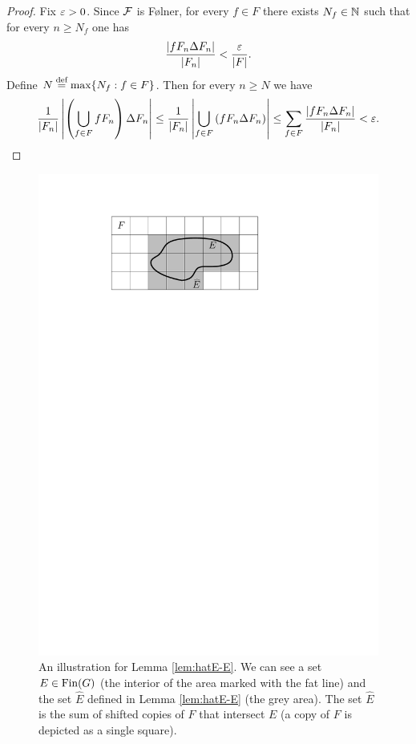 \begin{proof}
Fix $\varepsilon>0$. Since $\operatorname{\mathcal{F}}$ is F{\o}lner, for every $f\in F$ there exists $N_f\in\mathbb{N}$ such that for every $n\geq N_f$ one has
\[
\frac{|fF_n\Delta F_n|}{|F_n|}<\frac{\varepsilon}{|F|}.
\]
Define $N\stackrel{\textup{def}}{=} \max\{N_f: f\in F\}$. Then for every $n\geq N$ we have
\[
\frac{1}{|F_n|}\left|\left(\bigcup_{f\in F}fF_n\right)\Delta F_n\right|\leq \frac{1}{|F_n|}\left|\bigcup_{f\in F}\left(fF_n\Delta F_n\right)\right|\leq\sum_{f\in F}\frac{\left|fF_n\Delta F_n\right|}{|F_n|}<\varepsilon. \qedhere
\]
\end{proof}



\begin{figure}\label{fig:F-hull}
\centering
\includegraphics[scale=1]{Graphics/E_hat_densities.pdf}
\caption{An illustration for Lemma \ref{lem:hatE-E}. We can see a set $E\in\operatorname{Fin}(G)$ (the interior of the area marked with the fat line) and the set $\widehat E$ defined in Lemma \ref{lem:hatE-E}  (the grey area). The set $\widehat E$ is the sum of shifted copies of $F$ that intersect $E$ (a copy of $F$ is depicted as a single square). }
\end{figure}
